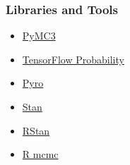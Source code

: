 \documentclass{beamer}
\begin{document}
\begin{frame}
  \frametitle{Libraries and Tools}
  \begin{itemize}
    \item \href{https://pymc-devs.github.io/pymc3/}{PyMC3}
    \item \href{https://www.tensorflow.org/probability/}{TensorFlow Probability}
    \item \href{http://pyro.ai}{Pyro}
    \item \href{http://mc-stan.org}{Stan}
    \item \href{https://mc-stan.org/users/interfaces/rstan}{RStan}
    \item \href{https://cran.r-project.org/web/packages/mcmc/index.html}{R mcmc}
  \end{itemize}
\end{frame}
\end{document}
